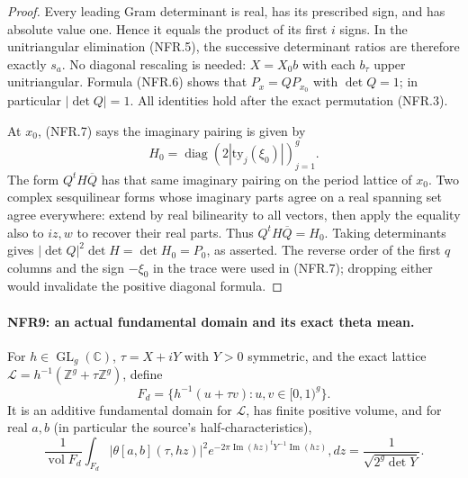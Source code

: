 \documentclass[11pt,a4paper]{article}
\numberwithin{equation}{section}
\theoremstyle{remark}\newtheorem{remark}[theorem]{Remark}
\begin{document}
\begin{proof}
Every leading Gram determinant is real, has its prescribed sign,
and has absolute value one.  Hence it equals the product of its
first $i$ signs.  In the unitriangular elimination (NFR.5), the
successive determinant ratios are therefore exactly $s_a$.
No diagonal rescaling is needed: $X=X_0b$ with each $b_\tau$
upper unitriangular.  Formula (NFR.6) shows that
$P_x=Q P_{x_0}$ with $\det Q=1$; in particular $|\det Q|=1$.
All identities hold after the exact permutation (NFR.3).

At $x_0$, (NFR.7) says the imaginary pairing is given by
\[
              H_0=\operatorname{diag}
                           (2|\mathrm{ty}_j(\xi_0)|)_{j=1}^g.
\]
The form $Q^tH\overline Q$ has that same imaginary pairing on
the period lattice of $x_0$.  Two complex sesquilinear forms
whose imaginary parts agree on a real spanning set agree
everywhere: extend by real bilinearity to all vectors, then
apply the equality also to $iz,w$ to recover their real parts.
Thus $Q^tH\overline Q=H_0$.
Taking determinants gives $|\det Q|^2\det H=\det H_0=P_0$,
as asserted.  The reverse order of the first $q$ columns and
the sign $-\xi_0$ in the trace were used in (NFR.7); dropping
either would invalidate the positive diagonal formula.
\end{proof}

\paragraph{NFR9: an actual fundamental domain and its exact theta mean.}
\label{claim:NFR9}
For $h\in\operatorname{GL}_g(\mathbb C)$, $\tau=X+iY$ with
$Y>0$ symmetric, and the exact lattice
$\mathcal L=h^{-1}(\mathbb Z^g+\tau\mathbb Z^g)$, define
\[
 F_d=\{h^{-1}(u+\tau v):u,v\in[0,1)^g\}.
\]
It is an additive fundamental domain for $\mathcal L$, has finite
positive volume, and for real $a,b$ (in particular the source's
half-characteristics),
\[
 \frac1{\operatorname{vol}F_d}\int_{F_d}
   |\theta[a,b](\tau,hz)|^2
    e^{-2\pi\operatorname{Im}(hz)^tY^{-1}\operatorname{Im}(hz)},dz
                       =\frac1{\sqrt{2^g\det Y}}.
 \tag{NFR.17}
\]
\end{document}
